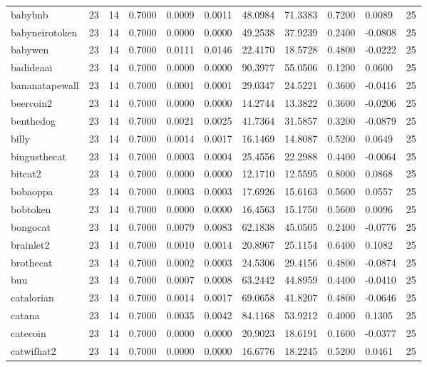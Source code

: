\begin{table}[htbp]
\begin{tabular}{lllllllllll}
babybnb & 23 & 14 & 0.7000 & 0.0009 & 0.0011 & 48.0984 & 71.3383 & 0.7200 & 0.0089 & 25 \\
babyneirotoken & 23 & 14 & 0.7000 & 0.0000 & 0.0000 & 49.2538 & 37.9239 & 0.2400 & -0.0808 & 25 \\
babywen & 23 & 14 & 0.7000 & 0.0111 & 0.0146 & 22.4170 & 18.5728 & 0.4800 & -0.0222 & 25 \\
badideaai & 23 & 14 & 0.7000 & 0.0000 & 0.0000 & 90.3977 & 55.0506 & 0.1200 & 0.0600 & 25 \\
bananatapewall & 23 & 14 & 0.7000 & 0.0001 & 0.0001 & 29.0347 & 24.5221 & 0.3600 & -0.0416 & 25 \\
beercoin2 & 23 & 14 & 0.7000 & 0.0000 & 0.0000 & 14.2744 & 13.3822 & 0.3600 & -0.0206 & 25 \\
benthedog & 23 & 14 & 0.7000 & 0.0021 & 0.0025 & 41.7364 & 31.5857 & 0.3200 & -0.0879 & 25 \\
billy & 23 & 14 & 0.7000 & 0.0014 & 0.0017 & 16.1469 & 14.8087 & 0.5200 & 0.0649 & 25 \\
bingusthecat & 23 & 14 & 0.7000 & 0.0003 & 0.0004 & 25.4556 & 22.2988 & 0.4400 & -0.0064 & 25 \\
bitcat2 & 23 & 14 & 0.7000 & 0.0000 & 0.0000 & 12.1710 & 12.5595 & 0.8000 & 0.0868 & 25 \\
bobaoppa & 23 & 14 & 0.7000 & 0.0003 & 0.0003 & 17.6926 & 15.6163 & 0.5600 & 0.0557 & 25 \\
bobtoken & 23 & 14 & 0.7000 & 0.0000 & 0.0000 & 16.4563 & 15.1750 & 0.5600 & 0.0096 & 25 \\
bongocat & 23 & 14 & 0.7000 & 0.0079 & 0.0083 & 62.1838 & 45.0505 & 0.2400 & -0.0776 & 25 \\
brainlet2 & 23 & 14 & 0.7000 & 0.0010 & 0.0014 & 20.8967 & 25.1154 & 0.6400 & 0.1082 & 25 \\
brothecat & 23 & 14 & 0.7000 & 0.0002 & 0.0003 & 24.5306 & 29.4156 & 0.4800 & -0.0874 & 25 \\
buu & 23 & 14 & 0.7000 & 0.0007 & 0.0008 & 63.2442 & 44.8959 & 0.4400 & -0.0410 & 25 \\
catalorian & 23 & 14 & 0.7000 & 0.0014 & 0.0017 & 69.0658 & 41.8207 & 0.4800 & -0.0646 & 25 \\
catana & 23 & 14 & 0.7000 & 0.0035 & 0.0042 & 84.1168 & 53.9212 & 0.4000 & 0.1305 & 25 \\
catecoin & 23 & 14 & 0.7000 & 0.0000 & 0.0000 & 20.9023 & 18.6191 & 0.1600 & -0.0377 & 25 \\
catwifhat2 & 23 & 14 & 0.7000 & 0.0000 & 0.0000 & 16.6776 & 18.2245 & 0.5200 & 0.0461 & 25 \\

\end{tabular}
\end{table}
